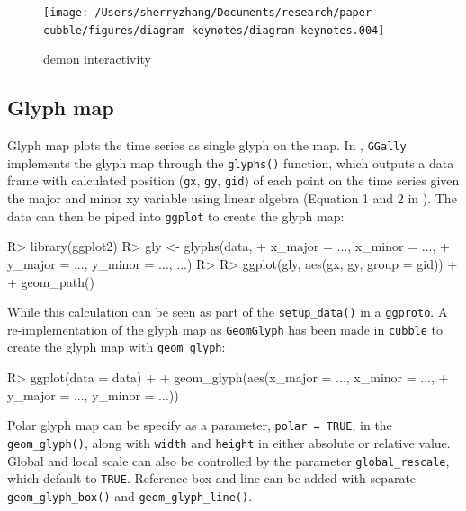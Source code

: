 \documentclass[
]{jss}
\begin{document}
\begin{CodeChunk}
\begin{figure}

{\centering \texttt{[image: /Users/sherryzhang/Documents/research/paper-cubble/figures/diagram-keynotes/diagram-keynotes.004]} 

}

\caption[demon interactivity]{demon interactivity}\label{fig:illu-interactive}
\end{figure}
\end{CodeChunk}

\hypertarget{glyph-map}{%
\subsection{Glyph map}\label{glyph-map}}

Glyph map \citep{Wickham2012-yr} plots the time series as single glyph
on the map. In , \texttt{GGally} implements the glyph map
through the \texttt{glyphs()} function, which outputs a data frame with
calculated position (\texttt{gx}, \texttt{gy}, \texttt{gid}) of each
point on the time series given the major and minor xy variable using
linear algebra (Equation 1 and 2 in \citet{Wickham2012-yr}). The data
can then be piped into \texttt{ggplot} to create the glyph map:

\begin{CodeChunk}
\begin{CodeInput}
R> library(ggplot2)
R> gly <- glyphs(data, 
+               x_major = ..., x_minor = ..., 
+               y_major = ..., y_minor = ..., ...)
R> 
R> ggplot(gly, aes(gx, gy, group = gid)) + 
+   geom_path() 
\end{CodeInput}
\end{CodeChunk}

While this calculation can be seen as part of the \texttt{setup\_data()}
in a \texttt{ggproto}. A re-implementation of the glyph map as
\texttt{GeomGlyph} has been made in \texttt{cubble} to create the glyph
map with \texttt{geom\_glyph}:

\begin{CodeChunk}
\begin{CodeInput}
R> ggplot(data = data) +
+   geom_glyph(aes(x_major = ..., x_minor = ..., 
+                  y_major = ..., y_minor = ...))
\end{CodeInput}
\end{CodeChunk}

Polar glyph map can be specify as a parameter, \texttt{polar\ =\ TRUE},
in the \texttt{geom\_glyph()}, along with \texttt{width} and
\texttt{height} in either absolute or relative value. Global and local
scale can also be controlled by the parameter \texttt{global\_rescale},
which default to \texttt{TRUE}. Reference box and line can be added with
separate \texttt{geom\_glyph\_box()} and \texttt{geom\_glyph\_line()}.
\end{document}

